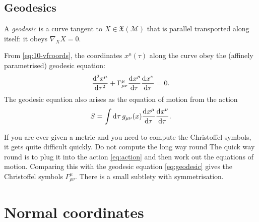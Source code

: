 \subsection{Geodesics}%
\label{sub:geodesics}

\begin{definition}
  A \emph{geodesic} is a curve tangent to $X \in \mathfrak{X}(\mathcal{M})$ that is parallel transported along itself: it obeys $\nabla_{X}X = 0$.
\end{definition}
From \eqref{eq:10-vfcoords}, the coordinates $x^\mu(\tau)$ along the curve obey the (affinely parametrised) geodesic equation:
\begin{equation}
  \label{eq:geodesic}
  \dv[2]{x^\mu}{\tau} + \Gamma^\mu_{\rho\nu} \dv[]{x^\rho}{\tau} \dv[]{x^\nu}{\tau} = 0.
\end{equation}
The geodesic equation also arises as the equation of motion from the action
\begin{equation}
  \label{eq:action}
  S = \int \dd[]{\tau} g_{\mu\nu}(x) \dv[]{x^\mu}{\tau} \dv[]{x^\nu}{\tau}.
\end{equation}
\begin{leftbar}
  \begin{remark}
    If you are ever given a metric and you need to compute the Christoffel symbols, it gets quite difficult quickly. Do not compute the long way round The quick way round is to plug it into the action \eqref{eq:action} and then work out the equations of motion. Comparing this with the geodesic equation \eqref{eq:geodesic} gives the Christoffel symbols $\Gamma^\mu_{\rho\nu}$. There is a small subtlety with symmetrisation.
  \end{remark}
\end{leftbar}

\section{Normal coordinates}%
\label{sec:normal_coordinates}

